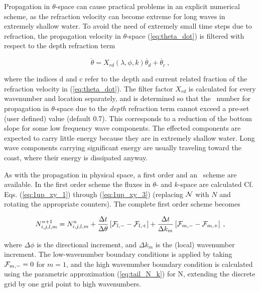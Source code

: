 Propagation in $\theta$-space can cause practical problems in an explicit
numerical scheme, as the refraction velocity can become extreme for long waves
in extremely shallow water. To avoid the need of extremely small time steps
due to refraction, the propagation velocity in $\theta$-space
(\ref{eq:theta_dot}) is filtered with respect to the depth refraction term


\begin{equation}
\dot{\theta} = X_{rd}(\lambda,\phi,k) \dot{\theta_d} + 
\dot{\theta_c} \: , \label{eq:theta_filter} \end{equation}

\noindent
where the indices d and c refer to the depth and current related fraction of
the refraction velocity in (\ref{eq:theta_dot}). The filter factor $X_{rd}$ is
calculated for every wavenumber and location separately, and is determined so
that the \cfl\ number for propagation in $\theta$-space due to the {\em depth}
refraction term cannot exceed a pre-set (user defined) value (default
0.7). This corresponds to a reduction of the bottom slope for some low
frequency wave components. The effected components are expected to carry
little energy because they are in extremely shallow water. Long wave
components carrying significant energy are usually traveling toward the coast,
where their energy is dissipated anyway.

\vspace{\baselineskip} \noindent 
As with the propagation in physical space, a first order and an \uq\ scheme
are available. In the first order scheme the fluxes in $\theta$- and $k$-space
are calculated Cf. Eqs. (\ref{eq:1up_xy_1}) through (\ref{eq:1up_xy_3})
(replacing ${\cal N}$ with $N$ and rotating the appropriate counters). The complete
first order scheme becomes


\begin{equation}
N_{i,j,l,m}^{n+1} = N_{i,j,l,m}^n 
 + \frac{\Delta t}{\Delta \theta} \left [ {\cal F}_{l,-} - {\cal F}_{l,+} \right ]
 + \frac{\Delta t}{\Delta k_m} \left [ {\cal F}_{m,-} - {\cal F}_{m,+} \right ]
\: , \label{eq:1up_intra_tot} \end{equation}

\noindent
where $\Delta \phi$ is the directional increment, and $\Delta k_m$ is the
(local) wavenumber increment. The low-wavenumber boundary conditions is
applied by taking ${\cal F}_{m,-}=0$ for $m=1$, and the high wavenumber boundary
condition is calculated using the parametric approximation (\ref{eq:tail_N_k})
for N, extending the discrete grid by one grid point to high wavenumbers.

